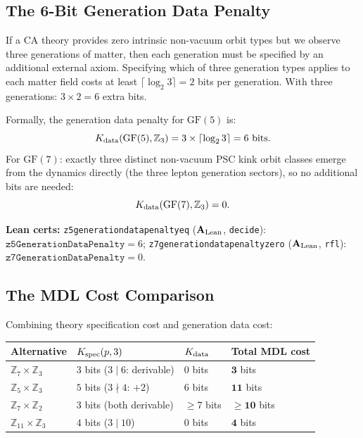 \documentclass[11pt,openany]{book}
\theoremstyle{remark}
\newcommand{\lean}[1]{%
  \penalty-100
  \begingroup\def\_{\textunderscore\allowbreak}\texttt{#1}\endgroup}
\newcommand{\CatAL}{\ensuremath{\textbf{A}_{\rm Lean}}}
\begin{document}
\subsection*{The 6-Bit Generation Data Penalty}

If a CA theory provides zero intrinsic non-vacuum orbit types but we observe three
generations of matter, then each generation must be specified by an additional external
axiom. Specifying which of three generation types applies to each matter field costs
at least $\lceil\log_2 3\rceil = 2$ bits per generation. With three generations: $3 \times 2 = 6$ extra bits.

Formally, the generation data penalty for $\mathrm{GF}(5)$ is:
\[
K_{\rm data}(\mathrm{GF}(5),\mathbb{Z}_3) = 3 \times \lceil\log_2 3\rceil = 6 \text{ bits}.
\]
For $\mathrm{GF}(7)$: exactly three distinct non-vacuum PSC kink orbit classes emerge
from the dynamics directly (the three lepton generation sectors), so no additional bits
are needed:
\[
K_{\rm data}(\mathrm{GF}(7),\mathbb{Z}_3) = 0.
\]

\textbf{Lean certs:}
\lean{z5\_generation\_data\_penalty\_eq} (\CatAL, \texttt{decide}):
$\mathtt{z5GenerationDataPenalty} = 6$;
\lean{z7\_generation\_data\_penalty\_zero} (\CatAL, \texttt{rfl}):
$\mathtt{z7GenerationDataPenalty} = 0$.

\subsection*{The MDL Cost Comparison}

Combining theory specification cost and generation data cost:

{\small
\begin{tabular}{@{}lp{3.4cm}p{2.0cm}p{2.4cm}@{}}
\toprule
Alternative & $K_{\rm spec}(p,3)$ & $K_{\rm data}$ & Total MDL cost \\
\midrule
$\mathbb{Z}_7\times\mathbb{Z}_3$ & $3$ bits ($3 \mid 6$: derivable) & $0$ bits & $\mathbf{3}$ bits \\
$\mathbb{Z}_5\times\mathbb{Z}_3$ & $5$ bits ($3 \nmid 4$: $+2$) & $6$ bits & $\mathbf{11}$ bits \\
$\mathbb{Z}_7\times\mathbb{Z}_2$ & $3$ bits (both derivable) & $\geq 7$ bits & $\geq\mathbf{10}$ bits \\
$\mathbb{Z}_{11}\times\mathbb{Z}_3$ & $4$ bits ($3 \mid 10$) & $0$ bits & $\mathbf{4}$ bits \\
\bottomrule
\end{tabular}
}
\end{document}
